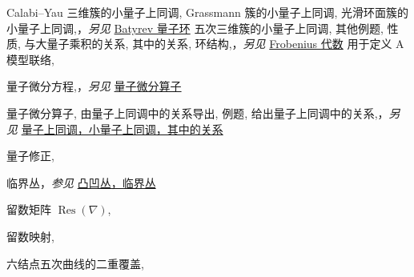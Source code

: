 \begin{theindex}
\subsubitem \leavevmode\hypertarget{idx:1139}{Calabi--Yau 三维簇的小量子上同调},\enspace{}
\subsubitem \leavevmode\hypertarget{idx:1140}{Grassmann 簇的小量子上同调},\enspace{}
\subsubitem \leavevmode\hypertarget{idx:1141}{光滑环面簇的小量子上同调},\enspace{}，\textit{另见} \hyperlink{idx:0069}{Batyrev 量子环}
\subsubitem \leavevmode\hypertarget{idx:1142}{五次三维簇的小量子上同调},\enspace{}
\subsubitem \leavevmode\hypertarget{idx:1143}{其他例题},\enspace{}
\subsubitem \leavevmode\hypertarget{idx:1144}{性质},\enspace{}
\subsubitem \leavevmode\hypertarget{idx:1145}{与大量子乘积的关系},\enspace{}
\subsubitem \leavevmode\hypertarget{idx:1146}{其中的关系},\enspace{}
\subsubitem \leavevmode\hypertarget{idx:1147}{环结构},\enspace{}，\textit{另见} \hyperlink{idx:0337}{Frobenius 代数}
\subsubitem \leavevmode\hypertarget{idx:1148}{用于定义 A 模型联络},\enspace{}
\indexspace
\item \leavevmode\hypertarget{idx:1150}{量子微分方程},\enspace{}，\textit{另见} \hyperlink{idx:1151}{量子微分算子}
\indexspace
\item \leavevmode\hypertarget{idx:1151}{量子微分算子},\enspace{}
\subitem \leavevmode\hypertarget{idx:1152}{由量子上同调中的关系导出},\enspace{}
\subitem \leavevmode\hypertarget{idx:1153}{例题},\enspace{}
\subitem \leavevmode\hypertarget{idx:1154}{给出量子上同调中的关系},\enspace{}，\textit{另见} \hyperlink{idx:1146}{量子上同调，小量子上同调，其中的关系}
\indexspace
\item \leavevmode\hypertarget{idx:1149}{量子修正},\enspace{}
\indexspace
\item \leavevmode\hypertarget{idx:0205}{临界丛}，\textit{参见} \hyperlink{idx:0147}{凸凹丛，临界丛}
\indexspace
\item \leavevmode\hypertarget{idx:1231}{留数矩阵 $\operatorname{Res}(\nabla)$},\enspace{}
\indexspace
\item \leavevmode\hypertarget{idx:1230}{留数映射},\enspace{}
\indexspace
\item \leavevmode\hypertarget{idx:0218}{六结点五次曲线的二重覆盖},\enspace{}

\end{theindex}
